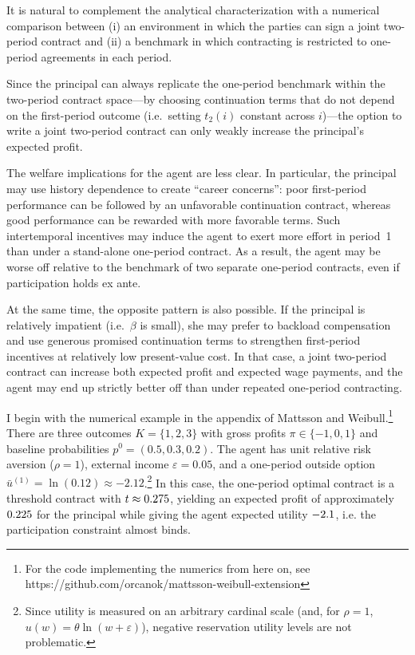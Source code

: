 \documentclass[12pt]{article}
\theoremstyle{definition}
\begin{document}
It is natural to complement the analytical characterization with a numerical comparison between (i) an environment in which the parties can sign a joint two-period 
contract and (ii) a benchmark in which contracting is restricted to one-period agreements in each period.

Since the principal can always replicate the one-period benchmark within the two-period contract space—by choosing continuation terms that do not depend on the 
first-period outcome (i.e.\ setting \(t_2(i)\) constant across \(i\))—the option to write a joint two-period contract can only weakly increase the principal’s expected profit.

The welfare implications for the agent are less clear. In particular, the principal may use history dependence to create ``career concerns'': poor 
first-period performance can be followed by an unfavorable continuation contract, whereas good performance can be rewarded with more favorable terms. 
Such intertemporal incentives may induce the agent to exert more effort in period~1 than under a stand-alone one-period contract. As a result, 
the agent may be worse off relative to the benchmark of two separate one-period contracts, even if participation holds ex ante.

At the same time, the opposite pattern is also possible. If the principal is relatively impatient (i.e.\ \(\beta\) is small), she may prefer to 
backload compensation and use generous promised continuation terms to strengthen first-period incentives at relatively low present-value cost. 
In that case, a joint two-period contract can increase both expected profit and expected wage payments, and the agent may end up strictly better off than under repeated one-period contracting.

I begin with the numerical example in the appendix of Mattsson and Weibull.\footnote{For the code implementing the numerics from here on, see https://github.com/orcanok/mattsson-weibull-extension}
There are three outcomes \(K=\{1,2,3\}\) with gross profits \(\pi\in\{-1,0,1\}\) 
and baseline probabilities \(p^0=(0.5,0.3,0.2)\). The agent has unit relative risk aversion (\(\rho=1\)), external income \(\varepsilon=0.05\), 
and a one-period outside option \(\bar u^{(1)}=\ln(0.12)\approx -2.12\).\footnote{Since utility is measured on an arbitrary cardinal scale 
(and, for \(\rho=1\), \(u(w)=\theta\ln(w+\varepsilon)\)), negative reservation utility levels are not problematic.} In this case, the one-period 
optimal contract is a threshold contract with \(t\approx 0.275\), yielding an expected profit of approximately \(0.225\) 
for the principal while giving the agent expected utility \(\fpeval{round(\Ubaselineoneperiod, 5)}\), i.e. the participation constraint almost binds.
\end{document}
